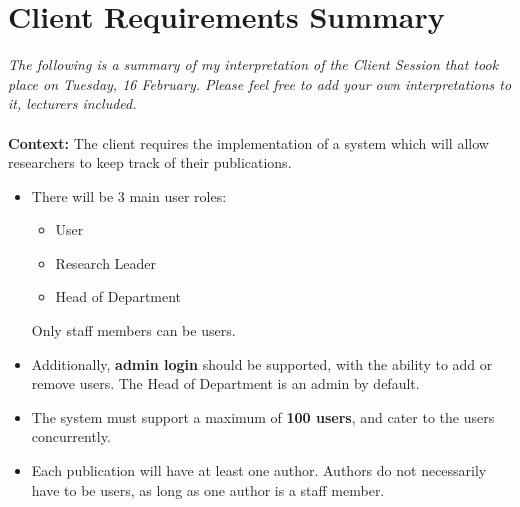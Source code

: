\documentclass[a4paper,12pt]{article}
\begin{document}
\section{Client Requirements Summary}

\textit{The following is a summary of my interpretation of the Client Session that took place on Tuesday, 16 February. Please feel free to add your own interpretations to it, lecturers included.}\\
\\
\textbf{Context: } The client requires the implementation of a system which will allow researchers to keep track of their publications. 

\begin{itemize}

\item There will be 3 main user roles:
\begin{itemize}
\item User
\item Research Leader
\item Head of Department
\end{itemize}
Only staff members can be users.

\item Additionally, \textbf{admin login} should be supported, with the ability to add or remove users. The Head of Department is an admin by default.

\item The system must support a maximum of \textbf{100 users}, and cater to the users concurrently.

\item Each publication will have at least one author. Authors do not necessarily have to be users, as long as one author is a staff member.


\end{itemize}
\end{document}
